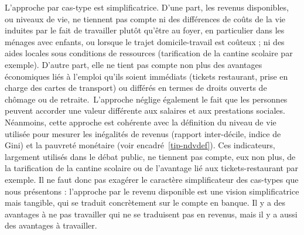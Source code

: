 \documentclass[
  french,
]{article}
\begin{document}
L'approche par cas-type est simplificatrice. D'une part, les revenus
disponibles, ou niveaux de vie, ne tiennent pas compte ni des
différences de coûts de la vie induites par le fait de travailler plutôt
qu'être au foyer, en particulier dans les ménages avec enfants, ou
lorsque le trajet domicile-travail est coûteux ; ni des aides locales
sous conditions de ressources (tarification de la cantine scolaire par
exemple). D'autre part, elle ne tient pas compte non plus des avantages
économiques liés à l'emploi qu'ils soient immédiats (tickets restaurant,
prise en charge des cartes de transport) ou différés en termes de droits
ouverts de chômage ou de retraite.~L'approche néglige également le fait
que les personnes peuvent accorder une valeur différente aux salaires et
aux prestations sociales. Néanmoins, cette approche est cohérente avec
la définition du niveau de vie utilisée pour mesurer les inégalités de
revenus (rapport inter-décile, indice de Gini) et la pauvreté monétaire
(voir encadré~\ref{tip-ndvdef}). Ces indicateurs, largement utilisés
dans le débat public, ne tiennent pas compte, eux non plus, de la
tarification de la cantine scolaire ou de l'avantage lié aux
tickets-restaurant par exemple. Il ne faut donc pas exagérer le
caractère simplificateur des cas-types que nous présentons : l'approche
par le revenu disponible est une vision simplificatrice mais tangible,
qui se traduit concrètement sur le compte en banque. Il y a des
avantages à ne pas travailler qui ne se traduisent pas en revenus, mais
il y a aussi des avantages à travailler.
\end{document}
